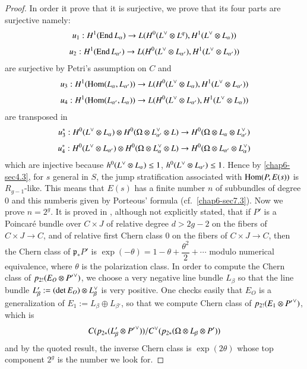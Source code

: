 \begin{proof}
In order it prove that it is surjective, we prove that its four parts
are surjective namely:
\begin{gather*}
u_{1}:H^{1}(\End L_{\alpha})\to L(H^{0}(L\spcheck \otimes L^{q}),
H^{1}(L\spcheck \otimes L_{\alpha}))\\[3pt]
u_{2}:H^{1}(\End L_{\alpha'})\to L(H^{0}(L\spcheck \otimes
L_{\alpha'}), H^{1}(L\spcheck \otimes L_{\alpha'}))
\end{gather*}
are surjective by Petri's assumption on $C$ and 
\begin{align*}
& u_{3}:H^{1}(\Hom(L_{\alpha},L_{\alpha'}))\to
L(H^{0}(L\spcheck \otimes L_{\alpha}), H^{1}(L\spcheck \otimes
L_{\alpha'}))\\[3pt]
& u_{4}:H^{1}(\Hom(L_{\alpha'},L_{\alpha}))\to
L(H^{0}(L\spcheck \otimes L_{\alpha'}), H^{1}(L\spcheck \otimes L_{\alpha}))
\end{align*}
are transposed in
\begin{gather*}
u^{*}_{3}:H^{0}(L\spcheck \otimes L_{\alpha})\otimes
H^{0}(\Omega\otimes L\spcheck_{\alpha'}\otimes L)\to
H^{0}(\Omega\otimes L_{\alpha}\otimes L\spcheck_{\alpha'})\\[3pt]
u^{*}_{4}:H^{0}(L\spcheck\otimes L_{\alpha'})\otimes
H^{0}(\Omega\otimes L\spcheck_{\alpha}\otimes L)\to
H^{0}(\Omega\otimes L_{\alpha'}\otimes L\spcheck_{\alpha})
\end{gather*}
which are injective because $h^{0}(L\spcheck \otimes L_{\alpha})\leq
1$, $h^{0}(L\spcheck\otimes L_{\alpha'})\leq 1$. Hence
by \ref{chap6-sec4.3}, for $s$ general in $S$, the jump stratification
associated with\break 
$\operatorname{Hom}(P,E(s))$ is $R_{g-1}$-like. This means that
$E(s)$ has a finite number $n$ of subbundles of degree $0$ and this
number\pageoriginale is given by Porteous' formula
(cf.~\ref{chap6-sec7.3}). Now we prove $n=2^{g}$. It is proved
in \cite{chap6-K1L}, although not explicitly stated, that if $P'$ is a
Poincar\'e bundle over $C\times J$ of relative degree $d>2g-2$ on the
fibers of $C\times J\to C$, and of relative first Chern class $0$ on
the fibers of $C\times J\to C$, then the Chern class of
$\mathfrak{p}_{\ast}P'$ is
$\exp(-\theta)=1-\theta+\dfrac{\theta^{2}}{2}+\cdots$ modulo numerical
equivalence, where $\theta$ is the polarization class. In order to
compute the Chern class of $p_{2!}(E_{O}\otimes {P'}\spcheck)$, we
choose a very negative line bundle $L_{\beta}$ so that the line bundle
$L'_{\beta}:=(\det E_{O})\otimes L\spcheck_{\beta}$ is very
positive. One checks easily that $E_{O}$ is a generalization of
$E_{1}:=L_{\beta}\oplus L_{\beta'}$, so that we compute Chern class of
$p_{2!}(E_{1}\otimes {P'}\spcheck)$, which is
$$
C(p_{2\ast}(L'_{\beta}\otimes
{P'}\spcheck))/C\spcheck(p_{2*}(\Omega\otimes L_{\beta}\otimes P'))
$$
and by the quoted result, the inverse Chern class is $\exp (2\theta)$
whose top component $2^{g}$ is the number we look for.
\end{proof}

